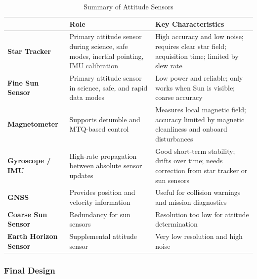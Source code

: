 \documentclass[a4paper, 11pt, conference]{IEEEtran}
\begin{document}
\begin{table}[H]
\centering
\caption{Summary of Attitude Sensors}
\begin{tabular}{p{3cm} p{7cm} p{7cm}}
\hline
 & \textbf{Role} 
 & \textbf{Key Characteristics} \\
\hline
\cellcolor{yellow!25}\textbf{Star Tracker} 
 & \cellcolor{yellow!25}Primary attitude sensor during science, safe modes, inertial pointing, IMU calibration 
 & \cellcolor{yellow!25}High accuracy and low noise; requires clear star field; acquisition time; limited by slew rate \\ 
\hline
\cellcolor{yellow!25}\textbf{Fine Sun Sensor} 
 & \cellcolor{yellow!25}Primary attitude sensor in science, safe, and rapid data modes 
 & \cellcolor{yellow!25}Low power and reliable; only works when Sun is visible; coarse accuracy \\ 
\hline
\cellcolor{yellow!25}\textbf{Magnetometer} 
 & \cellcolor{yellow!25}Supports detumble and MTQ-based control 
 & \cellcolor{yellow!25}Measures local magnetic field; accuracy limited by magnetic cleanliness and onboard disturbances \\ 
\hline
\cellcolor{yellow!25}\textbf{Gyroscope / IMU} 
 & \cellcolor{yellow!25}High-rate propagation between absolute sensor updates 
 & \cellcolor{yellow!25}Good short-term stability; drifts over time; needs correction from star tracker or sun sensors \\ 
\hline
\cellcolor{yellow!25}\textbf{GNSS} 
 & \cellcolor{yellow!25}Provides position and velocity information 
 & \cellcolor{yellow!25}Useful for collision warnings and mission diagnostics \\ 
\hline
\textbf{Coarse Sun Sensor} 
 & Redundancy for sun sensors 
 & Resolution too low for attitude determination \\ 
\hline
\textbf{Earth Horizon Sensor} 
 & Supplemental attitude sensor 
 & Very low resolution and high noise \\ 
\hline
\end{tabular}
\label{tab:sensors}
\end{table}



\subsubsection{Final Design}
\end{document}
